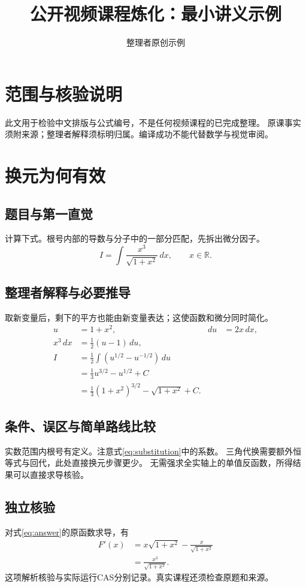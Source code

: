 \documentclass[UTF8,12pt,a4paper,fontset=fandol]{ctexart}
\title{公开视频课程炼化：最小讲义示例}
\author{整理者原创示例}
\date{}
\numberwithin{equation}{section}
\begin{document}
\maketitle
\section*{范围与核验说明}
此文用于检验中文排版与公式编号，不是任何视频课程的已完成整理。
原课事实须附来源；整理者解释须标明归属。编译成功不能代替数学与视觉审阅。
\tableofcontents
\section{换元为何有效}
\subsection{题目与第一直觉}
计算下式。根号内部的导数与分子中的一部分匹配，先拆出微分因子。
\begin{equation}\label{eq:question}
I=\int\frac{x^3}{\sqrt{1+x^2}}\,dx,\qquad x\in\mathbb R.
\end{equation}
\subsection{整理者解释与必要推导}
取新变量后，剩下的平方也能由新变量表达；这使函数和微分同时简化。
\begin{align}
u&=1+x^2, & du&=2x\,dx,\label{eq:substitution}\\
x^3\,dx&=\frac12(u-1)\,du,\\
I&=\frac12\int\left(u^{1/2}-u^{-1/2}\right)\,du\\
 &=\frac13u^{3/2}-u^{1/2}+C\\
 &=\frac13(1+x^2)^{3/2}-\sqrt{1+x^2}+C.\label{eq:answer}
\end{align}
\subsection{条件、误区与简单路线比较}
实数范围内根号有定义。注意式\eqref{eq:substitution}中的系数。
三角代换需要额外恒等式与回代，此处直接换元步骤更少。
无需强求全实轴上的单值反函数，所得结果可以直接求导核验。
\subsection{独立核验}
对式\eqref{eq:answer}的原函数求导，有
\begin{align}
F'(x)&=x\sqrt{1+x^2}-\frac{x}{\sqrt{1+x^2}}\\
&=\frac{x^3}{\sqrt{1+x^2}}.
\end{align}
这项解析核验与实际运行CAS分别记录。真实课程还须检查原题和来源。
\end{document}
